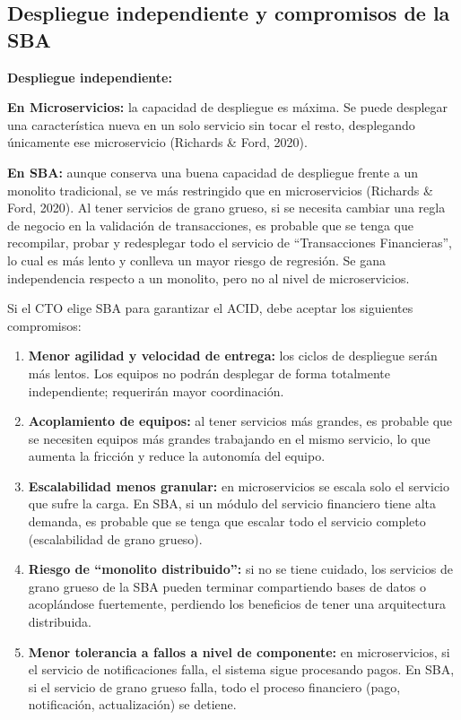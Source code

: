 \documentclass[12pt, a4paper]{article}
\begin{document}
    \subsection{Despliegue independiente y compromisos de la SBA}

    \textbf{Despliegue independiente:}

    \textbf{En Microservicios:} la capacidad de despliegue es máxima. Se puede desplegar una característica nueva en un solo servicio sin tocar el resto, desplegando únicamente ese microservicio (Richards \& Ford, 2020).

    \textbf{En SBA:} aunque conserva una buena capacidad de despliegue frente a un monolito tradicional, se ve más restringido que en microservicios (Richards \& Ford, 2020). Al tener servicios de grano grueso, si se necesita cambiar una regla de negocio en la validación de transacciones, es probable que se tenga que recompilar, probar y redesplegar todo el servicio de “Transacciones Financieras”, lo cual es más lento y conlleva un mayor riesgo de regresión. Se gana independencia respecto a un monolito, pero no al nivel de microservicios.

    Si el CTO elige SBA para garantizar el ACID, debe aceptar los siguientes compromisos:

    \begin{enumerate}
        \item \textbf{Menor agilidad y velocidad de entrega:} los ciclos de despliegue serán más lentos. Los equipos no podrán desplegar de forma totalmente independiente; requerirán mayor coordinación.
        \item \textbf{Acoplamiento de equipos:} al tener servicios más grandes, es probable que se necesiten equipos más grandes trabajando en el mismo servicio, lo que aumenta la fricción y reduce la autonomía del equipo.
        \item \textbf{Escalabilidad menos granular:} en microservicios se escala solo el servicio que sufre la carga. En SBA, si un módulo del servicio financiero tiene alta demanda, es probable que se tenga que escalar todo el servicio completo (escalabilidad de grano grueso).
        \item \textbf{Riesgo de “monolito distribuido”:} si no se tiene cuidado, los servicios de grano grueso de la SBA pueden terminar compartiendo bases de datos o acoplándose fuertemente, perdiendo los beneficios de tener una arquitectura distribuida.
        \item \textbf{Menor tolerancia a fallos a nivel de componente:} en microservicios, si el servicio de notificaciones falla, el sistema sigue procesando pagos. En SBA, si el servicio de grano grueso falla, todo el proceso financiero (pago, notificación, actualización) se detiene.
    \end{enumerate}
\end{document}
